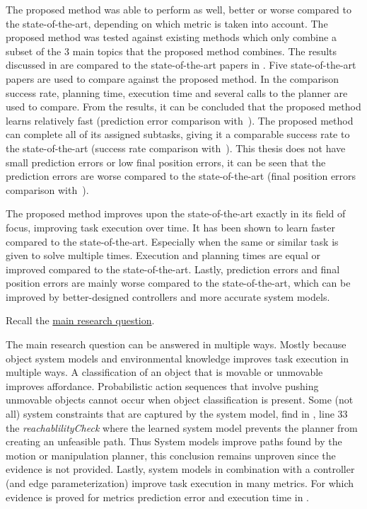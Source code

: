 The proposed method was able to perform as well, better or worse compared to the state-of-the-art, depending on which metric is taken into account. The proposed method was tested against existing methods which only combine a subset of the 3 main topics that the proposed method combines. 
The results discussed in  are compared to the state-of-the-art papers in . Five state-of-the-art papers are used to compare against the proposed method. In the comparison success rate, planning time, execution time and several calls to the planner are used to compare. From the results, it can be concluded that the proposed method learns relatively fast (prediction error comparison with~\cite{wang_affordancebased_2020}). The proposed method can complete all of its assigned subtasks, giving it a comparable success rate to the state-of-the-art (success rate comparison with~\cite{ellis_navigation_2022}). This thesis does not have small prediction errors or low final position errors, it can be seen that the prediction errors are worse compared to the state-of-the-art (final position errors comparison with~\cite{sabbaghnovin_model_2021}). \bs

The proposed method improves upon the state-of-the-art exactly in its field of focus, improving task execution over time. It has been shown to learn faster compared to the state-of-the-art. Especially when the same or similar task is given to solve multiple times. Execution and planning times are equal or improved compared to the state-of-the-art. Lastly, prediction errors and final position errors are mainly worse compared to the state-of-the-art, which can be improved by better-designed controllers and more accurate system models. 


Recall the \hyperref[researchquestion:main]{main research question}. \vspace{0.5\baselineskip}\\
\textit{\indent{}}\vspace{\baselineskip}

The main research question can be answered in multiple ways. Mostly because object system models and environmental knowledge improves task execution in multiple ways. A classification of an object that is movable or unmovable improves affordance. Probabilistic action sequences that involve pushing unmovable objects cannot occur when object classification is present. Some (not all) system constraints that are captured by the system model, find in , line 33 the \textit{reachablilityCheck} where the learned system model prevents the planner from creating an unfeasible path. Thus System models improve paths found by the motion or manipulation planner, this conclusion remains unproven since the evidence is not provided. Lastly, system models in combination with a controller (and edge parameterization) improve task execution in many metrics. For which evidence is proved for metrics prediction error and execution time in .\bs

